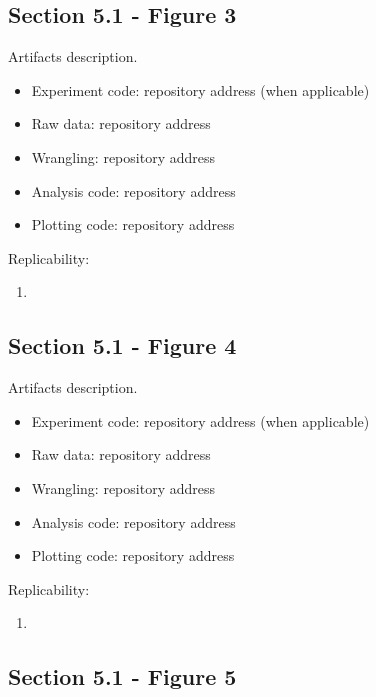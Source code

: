 \subsection{Section 5.1 - Figure 3}
\label{apndx:fig3}

Artifacts description.

\begin{itemize}
    \item Experiment code: repository address (when applicable)
    \item Raw data: repository address
    \item Wrangling: repository address
    \item Analysis code: repository address
    \item Plotting code: repository address
\end{itemize}

Replicability:

\begin{enumerate}
    \item
\end{enumerate}


\subsection{Section 5.1 - Figure 4}
\label{apndx:fig4}

Artifacts description.

\begin{itemize}
    \item Experiment code: repository address (when applicable)
    \item Raw data: repository address
    \item Wrangling: repository address
    \item Analysis code: repository address
    \item Plotting code: repository address
\end{itemize}

Replicability:

\begin{enumerate}
    \item
\end{enumerate}


\subsection{Section 5.1 - Figure 5}
\label{apndx:fig5}

